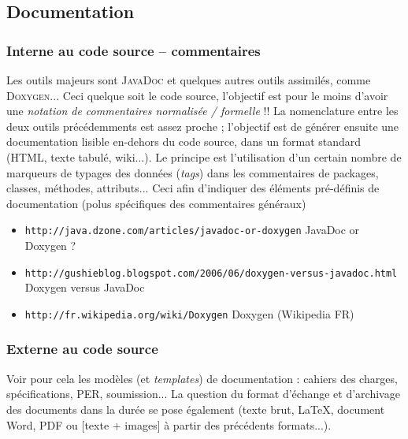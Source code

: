 \documentclass[11pt,twoside,a4paper]{article}
\begin{document}
\subsection{Documentation}

\subsubsection{Interne au code source -- commentaires}

Les outils majeurs sont \textsc{JavaDoc} et quelques autres outils assimil{\'e}s, comme \textsc{Doxygen}... Ceci quelque soit le code source, l'objectif est pour le moins d'avoir une \emph{notation de commentaires normalis{\'e}e / formelle} !! La nomenclature entre les deux outils pr{\'e}c{\'e}demments est assez proche ; l'objectif est de g{\'e}n{\'e}rer ensuite une documentation lisible en-dehors du code source, dans un format standard (HTML, texte tabul{\'e}, wiki...). Le principe est l'utilisation d'un certain nombre de marqueurs de typages des donn{\'e}es (\emph{tags}) dans les commentaires de packages, classes, m{\'e}thodes, attributs... Ceci afin d'indiquer des {\'e}l{\'e}ments pr{\'e}-d{\'e}finis de documentation (polus sp{\'e}cifiques des commentaires g{\'e}n{\'e}raux)
\begin{itemize}
	\item[] \texttt{http://java.dzone.com/articles/javadoc-or-doxygen} JavaDoc or Doxygen ?
	\item[] \texttt{http://gushieblog.blogspot.com/2006/06/doxygen-versus-javadoc.html} Doxygen versus JavaDoc
	\item[] \texttt{http://fr.wikipedia.org/wiki/Doxygen} Doxygen (Wikipedia FR)
\end{itemize}


\subsubsection{Externe au code source}

Voir pour cela les mod{\`e}les (et \emph{templates}) de documentation : cahiers des charges, sp{\'e}cifications, PER, soumission... La question du format d'{\'e}change et d'archivage des documents dans la dur{\'e}e se pose {\'e}galement (texte brut, \LaTeX, document Word, PDF ou [texte + images] {\`a} partir des pr{\'e}c{\'e}dents formats...). 

\clearpage
\clearpage
\end{document}
